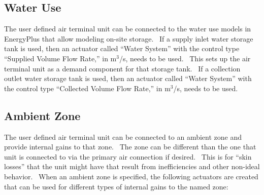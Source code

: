 \subsection{Water Use}\label{water-use-000}

The user defined air terminal unit can be connected to the water use models in EnergyPlus that allow modeling on-site storage.~ If a supply inlet water storage tank is used, then an actuator called ``Water System'' with the control type ``Supplied Volume Flow Rate,'' in m\(^{3}\)/s, needs to be used.~ This sets up the air terminal unit as a demand component for that storage tank.~ If a collection outlet water storage tank is used, then an actuator called ``Water System'' with the control type ``Collected Volume Flow Rate,'' in m\(^{3}\)/s, needs to be used.

\subsection{Ambient Zone}\label{ambient-zone-000}

The user defined air terminal unit can be connected to an ambient zone and provide internal gains to that zone.~ The zone can be different than the one that unit is connected to via the primary air connection if desired.~ This is for ``skin losses'' that the unit might have that result from inefficiencies and other non-ideal behavior.~ When an ambient zone is specified, the following actuators are created that can be used for different types of internal gains to the named zone:

